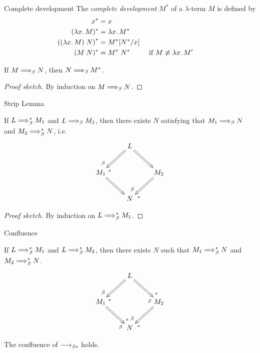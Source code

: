 \begin{frame}{Complete development}
  The \emph{complete development} $M^*$ of a $\lambda$-term $M$ is defined by
  \begin{align*}
    x^*      & = x \\
    (\lambda x.\, M)^* & = \lambda x.\, M^* \\
    \left((\lambda x.\, M)\;N\right)^* & = M^*[{N^*}/{x}] \\
    (M\;N)^* & = M^*\;N^* && \text{ if $M \not\equiv \lambda x.\,M'$ } 
  \end{align*}
  \begin{theorem}
    If $M \Longrightarrow_{\beta} N$, then $N \Longrightarrow_{\beta} M^*$.
  \end{theorem}
  \begin{proof}[Proof sketch]
    By induction on $M \Longrightarrow_{\beta} N$.
    
  \end{proof}
\end{frame}

\begin{frame}{Strip Lemma}
  \begin{theorem}
    If $L \Longrightarrow_{\beta}^* M_1$ and $L \Longrightarrow_{\beta} M_2$, then there exists $N$
    satisfying that $M_1 \Longrightarrow_{\beta} N$ and $M_2 \Longrightarrow_{\beta}^* N$, i.e.\
    \[
      \xymatrix{
        & L \ar@{=>}[rd] \ar@{=>}[ld]^(.8){*}_(.8){\beta} \\
        M_1 \ar@{=>}[rd] & & M_2 \ar@{=>}[ld]^(.8){*}_(.8){\beta} \\
            & N
      }
    \]
  \end{theorem}
  \begin{proof}[Proof sketch]
    By induction on $L \Longrightarrow_{\beta}^* M_1$. 
  \end{proof}
\end{frame}

\begin{frame}{Confluence}
  \begin{theorem}
    If $L \Longrightarrow_{\beta}^* M_1$ and $L \Longrightarrow_{\beta}^* M_2$, then there exists $N$ such that $M_1 \Longrightarrow_{\beta}^* N$ and $M_2 \Longrightarrow_{\beta}^* N$.
    \[
      \xymatrix{
        & L \ar@{=>}[rd]^(.8){*}_(.8){\beta} \ar@{=>}[ld]^(.8){*}_(.8){\beta} \\
        M_1 \ar@{=>}[rd]^(.8){*}_(.8){\beta} & & M_2 \ar@{=>}[ld]^(.8){*}_(.8){\beta} \\
            & N
      }
    \]
  \end{theorem}
  \begin{corollary}
    The confluence of $\longrightarrow_{\beta*}$ holds. 
    
  \end{corollary}
  
\end{frame}

